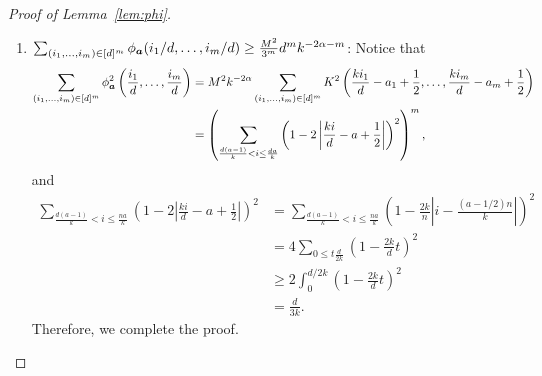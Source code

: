 \documentclass[12pt]{article}
\theoremstyle{definition}
\begin{document}
\begin{proof}[Proof of Lemma~\ref{lem:phi}]
\begin{enumerate}
 \item $\sum_{(i_1,\ldots,i_m)\in[d]^m}\phi_{\bm{a}}(i_1/d,\ldots,i_m/d)\geq \frac{M^2}{3^m}d^mk^{-2\alpha-m}$: Notice that 
 \begin{align}
     \sum_{(i_1,\ldots,i_m)\in[d]^m}\phi_{\bm{a}}^2\left(\frac{i_1}{d},\ldots,\frac{i_m}{d}\right) &= M^2k^{-2\alpha}\sum_{(i_1,\ldots,i_m)\in[d]^m}K^2\left(\frac{ki_1}{d}-a_1+\frac{1}{2},\ldots,\frac{ki_m}{d}-a_m+\frac{1}{2}\right)\\&=\left(\sum_{\frac{d(a-1)}{k}<i\leq\frac{da}{k}}\left(1-2\left|\frac{ki}{d}-a+\frac{1}{2}\right|\right)^2\right)^m,
 \end{align}
 and
 \begin{align}
     \sum_{\frac{d(a-1)}{k}<i\leq\frac{na}{k}}\left(1-2\left|\frac{ki}{d}-a+\frac{1}{2}\right|\right)^2&= \sum_{\frac{d(a-1)}{k}<i\leq\frac{na}{k}}\left(1-\frac{2k}{n}\left|i-\frac{(a-1/2)n}{k}\right|\right)^2\\&= 4\sum_{0\leq t\frac{d}{2k}}\left(1-\frac{2k}{d}t\right)^2\\&\geq 2\int_0^{d/2k}\left(1-\frac{2k}{d}t\right)^2\\&= \frac{d}{3k}.
 \end{align}
Therefore, we complete the proof.
 \end{enumerate}
 \end{proof}
 
\end{document}
